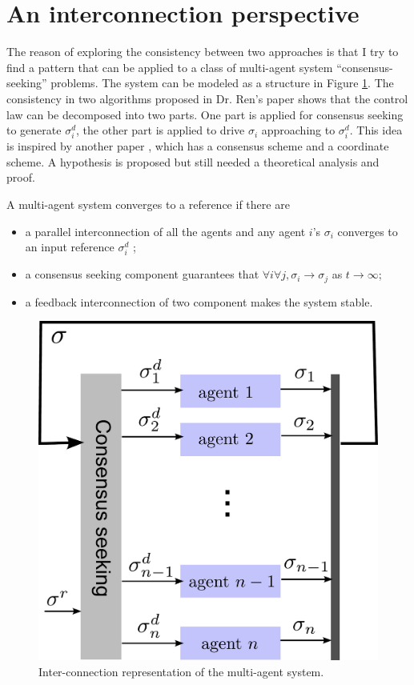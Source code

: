 \section{An interconnection perspective}
\label{sec:io_stable}

The reason of exploring the consistency between two approaches is that I try to find a pattern that can be applied to a class of multi-agent system ``consensus-seeking'' problems.
The system can be modeled as a structure in Figure \ref{fig:consensus_seeking}.
The consistency in two algorithms proposed in Dr. Ren's paper \cite{5229134} shows that the control law can be decomposed into two parts.
One part is applied for consensus seeking to generate $ \sigma^{d}_{i} $, the other part is applied to drive $ \sigma_{i} $ approaching to $ \sigma^{d}_{i} $.
This idea is inspired by another paper \cite{1470210}, which has a consensus scheme and a coordinate scheme.
A hypothesis is proposed but still needed a theoretical analysis and proof.
\begin{hyp}
\label{hyp:one}
A multi-agent system converges to a reference if there are 
\begin{itemize}
\item a parallel interconnection of all the agents and any agent $ i $'s $ \sigma_{i} $ converges to an input reference $ \sigma^{d}_{i} $ ;
\item a consensus seeking component guarantees that $ \forall i \forall j, \sigma_{i} \rightarrow \sigma_{j} $ as $ t \rightarrow \infty $;
\item a feedback interconnection of two component makes the system stable.
\end{itemize}
\end{hyp}


\begin{figure}
\centering
\includegraphics[width=0.4\linewidth]{./images/consensus_seeking}
\caption{Inter-connection representation of the multi-agent system.}
\label{fig:consensus_seeking}
\end{figure}